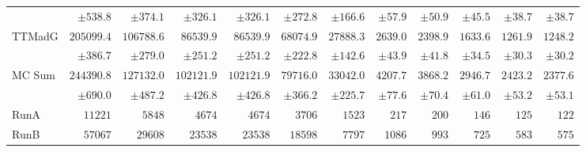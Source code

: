 \begin{landscape}
\begin{table}
\begin{tabular}{l | r r r r r r r r r r r }
                  &$ \pm            538.8 $&$ \pm            374.1 $&$ \pm            326.1 $&$ \pm            326.1 $&$ \pm            272.8 $&$ \pm            166.6 $&$ \pm             57.9 $&$ \pm             50.9 $&$ \pm             45.5 $&$ \pm             38.7 $&$ \pm             38.7 $ \\

           TTMadG &$          205099.4 $&$          106788.6 $&$           86539.9 $&$           86539.9 $&$           68074.9 $&$           27888.3 $&$            2639.0 $&$            2398.9 $&$            1633.6 $&$            1261.9 $&$            1248.2 $ \\

                  &$ \pm            386.7 $&$ \pm            279.0 $&$ \pm            251.2 $&$ \pm            251.2 $&$ \pm            222.8 $&$ \pm            142.6 $&$ \pm             43.9 $&$ \pm             41.8 $&$ \pm             34.5 $&$ \pm             30.3 $&$ \pm             30.2 $ \\

\hline

           MC Sum &$          244390.8 $&$          127132.0 $&$          102121.9 $&$          102121.9 $&$           79716.0 $&$           33042.0 $&$            4207.7 $&$            3868.2 $&$            2946.7 $&$            2423.2 $&$            2377.6 $ \\

                  &$ \pm            690.0 $&$ \pm            487.2 $&$ \pm            426.8 $&$ \pm            426.8 $&$ \pm            366.2 $&$ \pm            225.7 $&$ \pm             77.6 $&$ \pm             70.4 $&$ \pm             61.0 $&$ \pm             53.2 $&$ \pm             53.1 $ \\

\hline

             RunA &$             11221 $&$              5848 $&$              4674 $&$              4674 $&$              3706 $&$              1523 $&$               217 $&$               200 $&$               146 $&$               125 $&$               122 $ \\

             RunB &$             57067 $&$             29608 $&$             23538 $&$             23538 $&$             18598 $&$              7797 $&$              1086 $&$               993 $&$               725 $&$               583 $&$               575 $ \\


\end{tabular}
\end{table}
\end{landscape}
